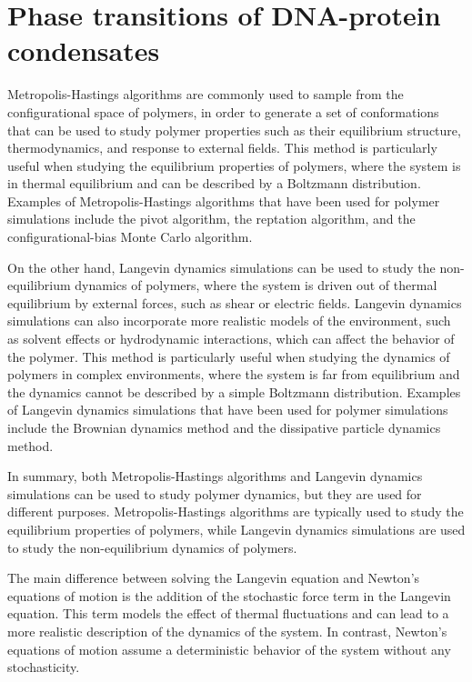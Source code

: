 \documentclass{ucetd}
\begin{document}
\chapter{Phase transitions of DNA-protein condensates}

Metropolis-Hastings algorithms are commonly used to sample from the configurational space of polymers, in order to generate a set of conformations that can be used to study polymer properties such as their equilibrium structure, thermodynamics, and response to external fields. This method is particularly useful when studying the equilibrium properties of polymers, where the system is in thermal equilibrium and can be described by a Boltzmann distribution. Examples of Metropolis-Hastings algorithms that have been used for polymer simulations include the pivot algorithm, the reptation algorithm, and the configurational-bias Monte Carlo algorithm.

On the other hand, Langevin dynamics simulations can be used to study the non-equilibrium dynamics of polymers, where the system is driven out of thermal equilibrium by external forces, such as shear or electric fields. Langevin dynamics simulations can also incorporate more realistic models of the environment, such as solvent effects or hydrodynamic interactions, which can affect the behavior of the polymer. This method is particularly useful when studying the dynamics of polymers in complex environments, where the system is far from equilibrium and the dynamics cannot be described by a simple Boltzmann distribution. Examples of Langevin dynamics simulations that have been used for polymer simulations include the Brownian dynamics method and the dissipative particle dynamics method.

In summary, both Metropolis-Hastings algorithms and Langevin dynamics simulations can be used to study polymer dynamics, but they are used for different purposes. Metropolis-Hastings algorithms are typically used to study the equilibrium properties of polymers, while Langevin dynamics simulations are used to study the non-equilibrium dynamics of polymers.


The main difference between solving the Langevin equation and Newton's equations of motion is the addition of the stochastic force term in the Langevin equation. This term models the effect of thermal fluctuations and can lead to a more realistic description of the dynamics of the system. In contrast, Newton's equations of motion assume a deterministic behavior of the system without any stochasticity.
\end{document}
